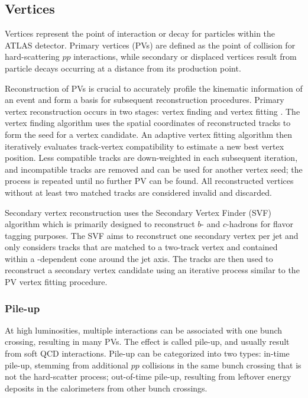 \documentclass[../thesis.tex]{subfiles}
\begin{document}
\subsection{Vertices}
\label{sec:vertex}
Vertices represent the point of interaction or decay for particles within the ATLAS detector. Primary vertices (\acs{PV}s) are defined as the point of collision for hard-scattering $pp$ interactions, while secondary or displaced vertices result from particle decays occurring at a distance from its production point. 

Reconstruction of \acs{PV}s is crucial to accurately profile the kinematic information of an event and form a basis for subsequent reconstruction procedures. Primary vertex reconstruction occurs in two stages: vertex finding and vertex fitting \citep{reco:vertex_primary}. The vertex finding algorithm uses the spatial coordinates of reconstructed tracks to form the seed for a vertex candidate. An adaptive vertex fitting algorithm \citep{reco:vertex_fitting} then iteratively evaluates track-vertex compatibility to estimate a new best vertex position. Less compatible tracks are down-weighted in each subsequent iteration, and incompatible tracks are removed and can be used for another vertex seed; the process is repeated until no further \acs{PV} can be found. All reconstructed vertices without at least two matched tracks are considered invalid and discarded.

Secondary vertex reconstruction uses the Secondary Vertex Finder (SVF) algorithm \citep{reco:vertex_secondary} which is primarily designed to reconstruct $b$- and $c$-hadrons for flavor tagging purposes. The SVF aims to reconstruct one secondary vertex per jet and only considers tracks that are matched to a two-track vertex and contained within a \pT-dependent cone around the jet axis. The tracks are then used to reconstruct a secondary vertex candidate using an iterative process similar to the \acs{PV} vertex fitting procedure.

\subsubsection*{Pile-up}
At high luminosities, multiple interactions can be associated with one bunch crossing, resulting in many \acs{PV}s. The effect is called pile-up, and usually result from soft \acs{QCD} interactions. Pile-up can be categorized into two types: in-time pile-up, stemming from additional $pp$ collisions in the same bunch crossing that is not the hard-scatter process; out-of-time pile-up, resulting from leftover energy deposits in the calorimeters from other bunch crossings.
\end{document}
